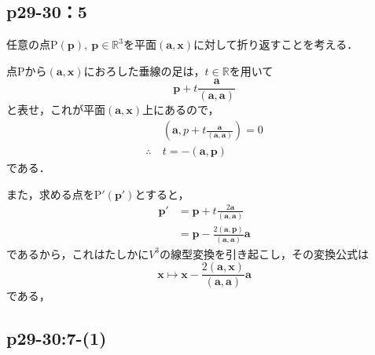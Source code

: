 \documentclass[uplatex,dvipdfmx,a4paper,11pt,fleqn]{jsarticle}
\begin{document}
\subsection*{p29-30：5}

\begin{tleftbar}
    任意の点$\mathrm{P}(\bm{p}),~\bm{p} \in \mathbb{R}^3$を平面$(\bm{a},\bm{x})$に対して折り返すことを考える．

    点$\mathrm{P}$から$(\bm{a},\bm{x})$におろした垂線の足は，$t \in \mathbb{R}$を用いて
    \[
        \bm{p} + t \frac{\bm{a}}{(\bm{a},\bm{a})}
    \]
    と表せ，これが平面$(\bm{a},\bm{x})$上にあるので，
    \begin{align*} 
        & (\bm{a},p+t\frac{\bm{a}}{(\bm{a},\bm{a})})=0 \\
        \therefore ~ & t=- (\bm{a},\bm{p}) 
    \end{align*} 
    である．
    
    また，求める点を$\mathrm{P}' (\bm{p}')$とすると，
    \begin{align*}
        \bm{p}' &= \bm{p}+t \frac{2\bm{a}}{(\bm{a},\bm{a})} \\
        & = \bm{p}-\frac{2(\bm{a},\bm{p})}{(\bm{a},\bm{a})} \bm{a}
    \end{align*}
    であるから，これはたしかに$V^3$の線型変換を引き起こし，その変換公式は
    \[
        \bm{x} \mapsto \bm{x}-\frac{2(\bm{a},\bm{x})}{(\bm{a},\bm{a})} \bm{a}
    \]
    である，
\end{tleftbar}

\subsection*{p29-30:7-(1)}
\end{document}
